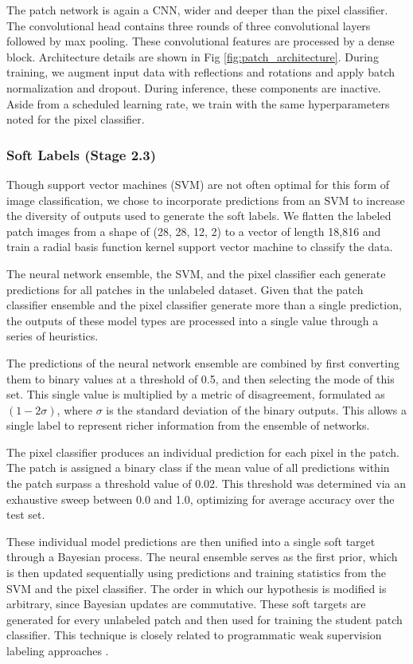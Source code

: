 \documentclass[10pt,letterpaper]{article}
\begin{document}
The patch network is again a CNN, wider and deeper than the pixel classifier. The convolutional head contains three rounds of three convolutional layers followed by max pooling. These convolutional features are processed by a dense block. Architecture details are shown in Fig \ref{fig:patch_architecture}. During training, we augment input data with reflections and rotations and apply batch normalization and dropout. During inference, these components are inactive. Aside from a scheduled learning rate, we train with the same hyperparameters noted for the pixel classifier.

\subsubsection*{Soft Labels (Stage 2.3)}
Though support vector machines (SVM) are not often optimal for this form of image classification, we chose to incorporate predictions from an SVM to increase the diversity of outputs used to generate the soft labels. We flatten the labeled patch images from a shape of (28, 28, 12, 2) to a vector of length 18,816 and train a radial basis function kernel support vector machine to classify the data.

The neural network ensemble, the SVM, and the pixel classifier each generate predictions for all patches in the unlabeled dataset. Given that the patch classifier ensemble and the pixel classifier generate more than a single prediction, the outputs of these model types are processed into a single value through a series of heuristics.

The predictions of the neural network ensemble are combined by first converting them to binary values at a threshold of 0.5, and then selecting the mode of this set. This single value is multiplied by a metric of disagreement, formulated as $(1 - 2\sigma)$, where $\sigma$ is the standard deviation of the binary outputs. This allows a single label to represent richer information from the ensemble of networks.

The pixel classifier produces an individual prediction for each pixel in the patch. The patch is assigned a binary class if the mean value of all predictions within the patch surpass a threshold value of 0.02. This threshold was determined via an exhaustive sweep between 0.0 and 1.0, optimizing for average accuracy over the test set.

These individual model predictions are then unified into a single soft target through a Bayesian process. The neural ensemble serves as the first prior, which is then updated sequentially using predictions and training statistics from the SVM and the pixel classifier. The order in which our hypothesis is modified is arbitrary, since Bayesian updates are commutative. These soft targets are generated for every unlabeled patch and then used for training the student patch classifier. This technique is closely related to programmatic weak supervision labeling approaches \cite{https://doi.org/10.48550/arxiv.2202.05433}.
\end{document}
